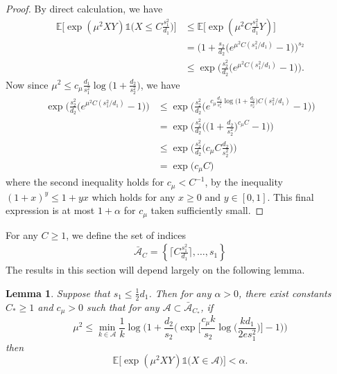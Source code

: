 \documentclass{article}
\newcommand{\cA}{\mathcal{A}}
\newcommand{\EE}{\mathbb{E}}
\newcommand{\one}{\mathds{1}}
\newcommand{\Ct}{C_{*}}
\newtheorem{lemma}{Lemma}
\theoremstyle{remark}
\begin{document}
\begin{proof}
   By direct calculation, we have
    \begin{align*}
        \EE\Big[\exp(\mu^2XY)\one\big(X \leq C \frac{s_1^2}{d_1}\big)\Big] &\leq \EE\Big[\exp(\mu^2C \frac{s_1^2}{d_1}Y)\Big] \\ 
        &= \Big(1 + \frac{s_2}{d_2}\big(e^{\mu^2C (s_1^2/d_1)} - 1\big)\Big)^{s_2} \\ 
        &\leq \exp\Big(\frac{s_2^2}{d_2}\big(e^{\mu^2C (s_1^2/d_1)} - 1\big)\Big).
    \end{align*}
    Now since $\mu^2 \leq c_{\mu}\frac{d_1}{s_1^2}\log\big(1 + \frac{d_2}{s_2^2}\big)$, we have 
    \begin{align*}
        \exp\Big(\frac{s_2^2}{d_2}\big(e^{\mu^2C (s_1^2/d_1)} - 1\big)\Big) &\leq \exp\Big(\frac{s_2^2}{d_2}\big(e^{c_{\mu}\frac{d_1}{s_1^2}\log\big(1 + \frac{d_2}{s_2^2}\big)C (s_1^2/d_1)} - 1\big)\Big) \\ 
        &= \exp\Big(\frac{s_2^2}{d_2}\big(\big(1 + \frac{d_2}{s_2^2}\big)^{c_{\mu}C} - 1\big)\Big) \\ 
        &\leq \exp\Big(\frac{s_2^2}{d_2}\big(c_{\mu}C\frac{d_2}{s_2^2}\big)\Big) \\
        &= \exp\big(c_\mu C\big)
    \end{align*}
    where the second inequality holds for $c_\mu < C^{-1}$, by the inequality $(1+x)^y \leq 1+y x$ which holds for any $x\geq 0$ and $y \in [0,1]$. This final expression is at most $1 + \alpha$ for $c_\mu$ taken sufficiently small.
\end{proof}

For any $C \geq 1$, we define the set of indices
\begin{align}
    \bar{\cA}_C = \left\{ \Big\lceil C\frac{s_1^2}{d_1}\Big\rceil, \dots , s_1\right\}\label{eq_def_A_C}
\end{align}
The results in this section will depend largely on the following lemma.

\begin{lemma}\label{lemma:geom-series}
    Suppose that $s_1 \leq \frac12d_1$. Then for any $\alpha > 0$, there exist constants $\Ct \geq 1$ and $c_\mu > 0$ such that for any $\cA \subset \bar{\cA}_{\Ct}$, if
    \[\mu^2 \leq \min_{k \in \cA}\frac{1}{k}\log\Bigg(1 + \frac{d_2}{s_2}\bigg(\exp\Big[\frac{c_\mu k}{s_2}\log\big(\frac{kd_1}{2es_1^2}\big)\Big] - 1\bigg)\Bigg)\]
    then 
    \[\EE\Big[\exp(\mu^2XY)\one\Big(X \in \cA \Big)\Big] < \alpha.\]

\end{lemma}
\end{document}
